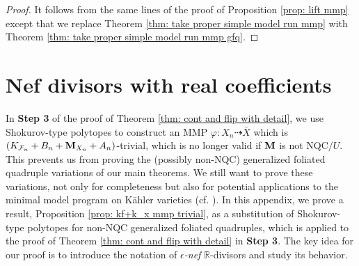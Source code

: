 \documentclass[11pt]{amsart}
\numberwithin{equation}{section}
\newcommand{\Mm}{{\bf{M}}}
\newcommand{\Rr}{\mathbb{R}}
\newcommand{\Ff}{\mathcal{F}}
\theoremstyle{definition}
\theoremstyle{definition}
\theoremstyle{definition}
\begin{document}
\begin{proof}
    It follows from the same lines of the proof of Proposition \ref{prop: lift mmp} except that we replace Theorem \ref{thm: take proper simple model run mmp} with Theorem \ref{thm: take proper simple model run mmp gfq}.
\end{proof}




\section{Nef divisors with real coefficients}\label{sec: enef}

In \textbf{Step 3} of the proof of Theorem \ref{thm: cont and flip with detail}, we use Shokurov-type polytopes to construct an MMP $\varphi: X_n\dashrightarrow\bar X$ which is $(K_{\Ff_n}+B_n+\Mm_{X_n}+A_n)$-trivial, which is no longer valid if $\Mm$ is not NQC$/U$. This prevents us from proving the (possibly non-NQC) generalized foliated quadruple variations of our main theorems. We still want to prove these variations, not only for completeness but also for potential applications to the minimal model program on K\"ahler varieties (cf. \cite{DH23,DHY23}). In this appendix, we prove a result, Proposition \ref{prop: kf+k_x mmp trivial}, as a substitution of Shokurov-type polytopes for non-NQC generalized foliated quadruples, which is applied to the proof of Theorem \ref{thm: cont and flip with detail} in \textbf{Step 3}. The key idea for our proof is to introduce the notation of \emph{$\epsilon$-nef} $\Rr$-divisors and study its behavior.
\end{document}
